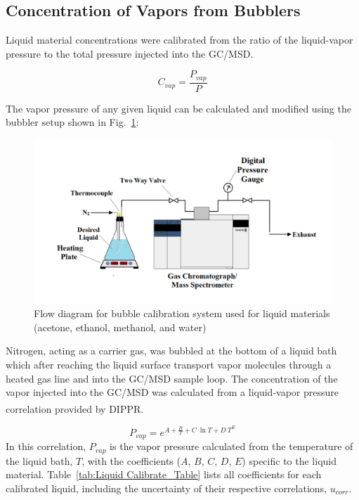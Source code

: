\documentclass[12pt]{article}
\begin{document}
\pagebreak
\subsection{Concentration of Vapors from Bubblers}
\label{sssec:Concentration of Vapors from Bubblers}

Liquid material concentrations were calibrated from the ratio of the liquid-vapor pressure to the total pressure injected into the GC/MSD.

\begin{equation}
\label{eq:liquid_vapor_concentration}
C_{vap} =\frac {P_{vap}}{P}
\end{equation}

The vapor pressure of any given liquid can be calculated and modified using the bubbler setup shown in Fig.~\ref{fig:Bubbler}: 

\begin{figure}[h!]
	\centering
\includegraphics[width=\textwidth,keepaspectratio]{Bubbler_Setup.png}
	\caption[Flow diagram for bubble calibration system used for liquid materials]{Flow diagram for bubble calibration system used for liquid materials (acetone, ethanol, methanol, and water)}
	\label{fig:Bubbler}
\end{figure}
Nitrogen, acting as a carrier gas, was bubbled at the bottom of a liquid bath which after reaching the liquid surface transport vapor molecules through a heated gas line and into the GC/MSD sample loop. The concentration of the vapor injected into the GC/MSD was calculated from a liquid-vapor pressure correlation provided by DIPPR\textsuperscript{\textregistered}.

\begin{equation}
\label{eq:liquid_vapor_pressure_correlation}
P_{vap} =e^{A+\frac{B}{T}+C~\ln{T}+D~T^{E}}
\end{equation}
In this correlation, $P_{vap}$ is the vapor pressure calculated from the temperature of the liquid bath, $T$, with the coefficients ($A$, $B$, $C$, $D$, $E$) specific to the liquid material. Table~\ref{tab:Liquid Calibrate_Table} lists all coefficients for each calibrated liquid, including the uncertainty of their respective correlations, $u_{corr}$. 
\end{document}
